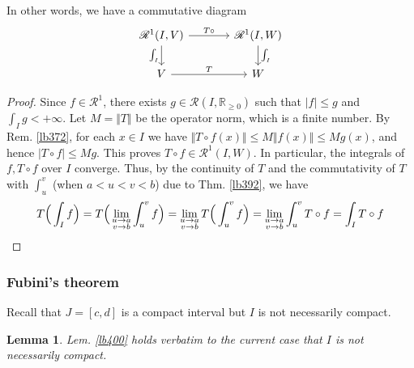 \documentclass[12pt,b5paper,notitlepage]{article}
\theoremstyle{definition}
\theoremstyle{plain}
\newtheorem{lm}[df]{Lemma}
\newcommand{\scr}{\mathscr}
\newcommand{\Rbb}{\mathbb R}
\numberwithin{equation}{section}
\begin{document}
In other words, we have a commutative diagram
\begin{equation}\label{eq175}
\begin{tikzcd}[column sep=large]
\scr R^1(I,V) \arrow[r,"T\circ"] \arrow[d,"\int_I"'] & \scr R^1(I,W) \arrow[d,"\int_I"] \\
V \arrow[r,"T"]           & W        
\end{tikzcd} 
\end{equation}


\begin{proof}
Since $f\in\scr R^1$, there exists $g\in\scr R(I,\Rbb_{\geq0})$ such that $|f|\leq g$ and $\int_Ig<+\infty$. Let $M=\Vert T\Vert$ be the operator norm, which is a finite number. By Rem. \ref{lb372}, for each $x\in I$ we have $\Vert T\circ f(x)\Vert\leq M\Vert f(x)\Vert\leq Mg(x)$, and hence $|T\circ f|\leq Mg$. This proves $T\circ f\in\scr R^1(I,W)$. In particular, the integrals of $f,T\circ f$ over $I$ converge. Thus, by the continuity of $T$ and the commutativity of $T$ with $\int_u^v$ (when  $a<u<v<b$) due to Thm. \ref{lb392}, we have
\begin{align*}
T\Big(\int_If\Big)=T\Big(\lim_{
\begin{subarray}{c}
u\rightarrow a\\
v\rightarrow b
\end{subarray}}\int_u^v f\Big)=\lim_{
\begin{subarray}{c}
u\rightarrow a\\
v\rightarrow b
\end{subarray}}T\Big(\int_u^v f\Big)=\lim_{
\begin{subarray}{c}
u\rightarrow a\\
v\rightarrow b
\end{subarray}}\int_u^v T\circ f=\int_IT\circ f
\end{align*}
\end{proof}



\subsubsection{Fubini's theorem}

Recall that $J=[c,d]$ is a compact interval but $I$ is not necessarily compact.

\begin{lm}\label{lb423}
Lem. \ref{lb400} holds verbatim to the current case that $I$ is not necessarily compact.
\end{lm}
\end{document}

